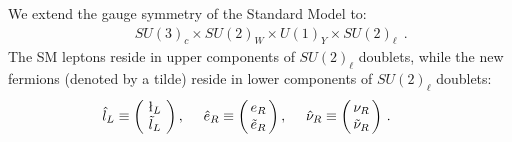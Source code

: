 \documentclass[prd,showpcs,amsmath,amssymb,nofootinbib,preprintnumbers,balancelastpage,longbibliography,superscriptaddress,notitlepage]{revtex4}
\def\bea{\begin{eqnarray}}
\def\eea{\end{eqnarray}}
\def\bea{\begin{eqnarray}}
\def\eea{\end{eqnarray}}
\begin{document}
We extend the gauge symmetry of the Standard Model to:
\begin{eqnarray}
&&SU(3)_c \times SU(2)_{W} \times U(1)_Y  \times SU(2)_{\ell}\ \ .
\end{eqnarray}
 The SM leptons reside in upper components of $SU(2)_\ell$ doublets, while the new fermions (denoted by a tilde) reside in lower components of $SU(2)_\ell$ doublets:
\bea
&& \hspace{-10mm}\hat{l}_L \equiv \left(\!
  \begin{array}{c}
    \l_{L}\\
    \tilde{l}_{L} \\
  \end{array}\!
\right)  , \ \ \ \ \hat{e}_{R} \equiv \left(\!\!
  \begin{array}{c}
    e_R\\
    \tilde{e}_R \\
  \end{array}\!\!
\right)  , \ \ \ \ \hat{\nu}_{R} \equiv \left(\!\!
  \begin{array}{c}
    \nu_R \\
    \tilde{\nu}_R \\
  \end{array}\!\!
\right)\,.
\eea
\end{document}
